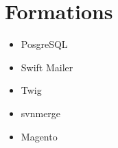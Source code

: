 \section{Formations}

\begin{itemize}
	\item PosgreSQL
	\item Swift Mailer
	\item Twig
	\item svnmerge
	\item Magento
\end{itemize}
